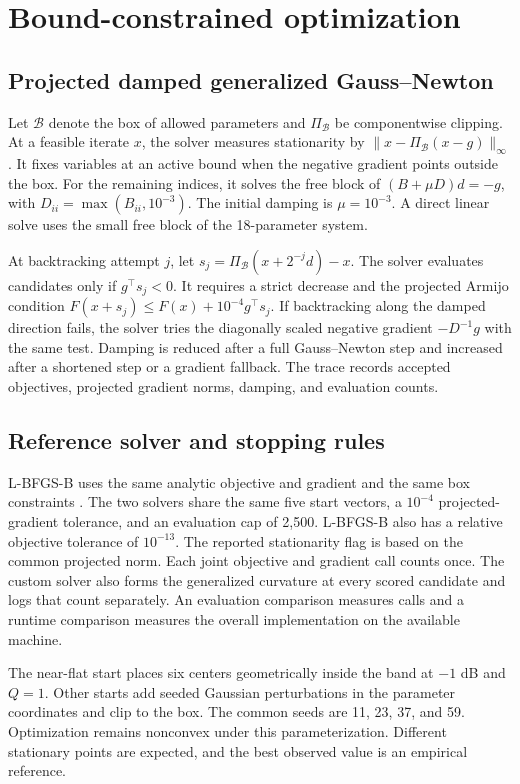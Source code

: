 \documentclass[11pt,letterpaper]{article}
\begin{document}
\clearpage
\section{Bound-constrained optimization}
\subsection{Projected damped generalized Gauss--Newton}
Let $\mathcal B$ denote the box of allowed parameters and $\Pi_{\mathcal B}$
be componentwise clipping. At a feasible iterate $x$, the solver measures
stationarity by $\|x-\Pi_{\mathcal B}(x-g)\|_\infty$.
It fixes variables at an active bound when the negative gradient points
outside the box. For the remaining indices, it solves the free block of
$(B+\mu D)d=-g$, with $D_{ii}=\max(B_{ii},10^{-3})$.
The initial damping is $\mu=10^{-3}$. A direct linear solve uses the small
free block of the 18-parameter system.

At backtracking attempt $j$, let
$s_j=\Pi_{\mathcal B}(x+2^{-j}d)-x$. The solver evaluates candidates only if
$g^\top s_j<0$. It requires a strict decrease and the projected Armijo
condition $F(x+s_j)\leq F(x)+10^{-4}g^\top s_j$.
If backtracking along the damped direction fails, the solver tries the
diagonally scaled negative gradient $-D^{-1}g$ with the same test. Damping is
reduced after a full Gauss--Newton step and increased after a shortened step
or a gradient fallback. The trace records accepted objectives, projected
gradient norms, damping, and evaluation counts.

\subsection{Reference solver and stopping rules}
L-BFGS-B uses the same analytic objective and gradient and the same box
constraints \cite{byrd}. The two solvers share the same five start vectors,
a $10^{-4}$ projected-gradient tolerance, and an evaluation cap of 2,500.
L-BFGS-B also has a relative objective tolerance of $10^{-13}$.
The reported stationarity flag is based on the common projected norm.
Each joint objective and gradient call counts once. The custom solver also
forms the generalized curvature at every scored candidate and logs that
count separately. An evaluation comparison measures calls and a runtime
comparison measures the overall implementation on the available machine.

The near-flat start places six centers geometrically inside the band at
$-1$ dB and $Q=1$. Other starts add seeded Gaussian perturbations in the
parameter coordinates and clip to the box. The common seeds are 11, 23, 37,
and 59. Optimization remains nonconvex under this parameterization. Different
stationary points are expected, and the best observed value is an empirical
reference.
\end{document}
